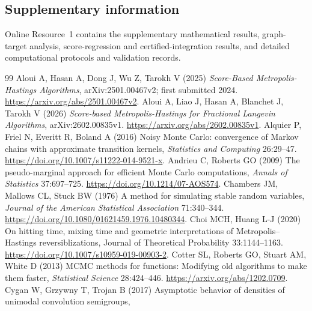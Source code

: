 \documentclass[pdflatex,iicol,sn-mathphys-ay]{sn-jnl}
\theoremstyle{definition}\newtheorem{definition}[theorem]{Definition}
\theoremstyle{remark}\newtheorem{remark}[theorem]{Remark}
\numberwithin{equation}{section}
\newcommand{\1}{\mathbf 1}
\begin{document}
\subsection*{Supplementary information}
Online Resource~1 contains the supplementary mathematical results, graph-target analysis, score-regression and certified-integration results, and detailed computational protocols and validation records.







\begin{thebibliography}{99}
 Aloui A, Hasan A, Dong J, Wu Z, Tarokh V (2025) \emph{Score-Based Metropolis-Hastings Algorithms}, arXiv:2501.00467v2; first submitted 2024. \url{https://arxiv.org/abs/2501.00467v2}.
 Aloui A, Liao J, Hasan A, Blanchet J, Tarokh V (2026) \emph{Score-based Metropolis-Hastings for Fractional Langevin Algorithms}, arXiv:2602.00835v1. \url{https://arxiv.org/abs/2602.00835v1}.
 Alquier P, Friel N, Everitt R, Boland A (2016) Noisy Monte Carlo: convergence of Markov chains with approximate transition kernels, \emph{Statistics and Computing} 26:29--47. \url{https://doi.org/10.1007/s11222-014-9521-x}.
 Andrieu C, Roberts GO (2009) The pseudo-marginal approach for efficient Monte Carlo computations, \emph{Annals of Statistics} 37:697--725. \url{https://doi.org/10.1214/07-AOS574}.
 Chambers JM, Mallows CL, Stuck BW (1976) A method for simulating stable random variables,
\emph{Journal of the American Statistical Association} 71:340--344. \url{https://doi.org/10.1080/01621459.1976.10480344}.
 Choi MCH, Huang L-J (2020) On hitting time, mixing time and geometric interpretations of Metropolis--Hastings reversiblizations, Journal of Theoretical Probability 33:1144--1163. \url{https://doi.org/10.1007/s10959-019-00903-2}.
 Cotter SL, Roberts GO, Stuart AM, White D (2013) MCMC methods for functions: Modifying old algorithms to make them faster,
\emph{Statistical Science} 28:424--446. \url{https://arxiv.org/abs/1202.0709}.
 Cygan W, Grzywny T, Trojan B (2017) Asymptotic behavior of densities of unimodal convolution semigroups,

\end{thebibliography}
\end{document}

